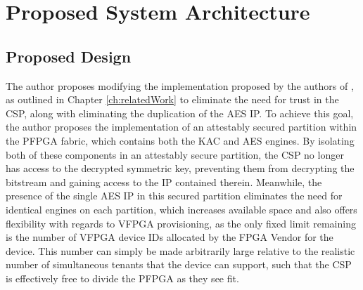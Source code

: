 
\chapter{Proposed System Architecture}\label{ch:systemArchitecture}

\section{Proposed Design}\label{subsec:Proposal}
The author proposes modifying the implementation proposed by the authors of \cite{bag_cryptographically_2020}, as outlined in Chapter \ref{ch:relatedWork} to eliminate the need for trust in the CSP, along with eliminating the duplication of the AES IP. To achieve this goal, the author proposes the implementation of an attestably secured partition within the PFPGA fabric, which contains both the KAC and AES engines. By isolating both of these components in an attestably secure partition, the CSP no longer has access to the decrypted symmetric key, preventing them from decrypting the bitstream and gaining access to the IP contained therein. Meanwhile, the presence of the single AES IP in this secured partition eliminates the need for identical engines on each partition, which increases available space and also offers flexibility with regards to VFPGA provisioning, as the only fixed limit remaining is the number of VFPGA device IDs allocated by the FPGA Vendor for the device. This number can simply be made arbitrarily large relative to the realistic number of simultaneous tenants that the device can support, such that the CSP is effectively free to divide the PFPGA as they see fit.


